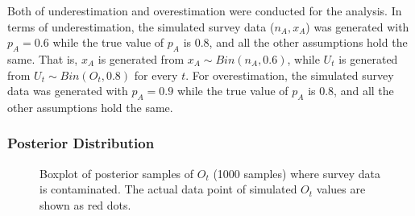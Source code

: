 \documentclass[]{article}
\begin{document}
Both of underestimation and overestimation were conducted for the analysis. In terms of underestimation, the simulated survey data ($n_A, x_A$) was generated with $p_A=0.6$ while the true value of $p_A$ is 0.8, and all the other assumptions hold the same. That is, $x_A$ is generated from $x_A \sim Bin(n_A, 0.6)$, while $U_t$ is generated from $U_t \sim Bin(O_t, 0.8)$ for every $t$. For overestimation, the simulated survey data was generated with $p_A=0.9$ while the true value of $p_A$ is 0.8, and all the other assumptions hold the same.  \\

\subsubsection{Posterior Distribution}

\begin{figure}[htb]
	\centering
	\caption[two early result box plots:]{Boxplot of posterior samples of $O_t$ (1000 samples) where survey data is contaminated.  The actual data point of simulated $O_t$ values are shown as red dots.}
	\label{contam_ot}
\end{figure}
\end{document}
